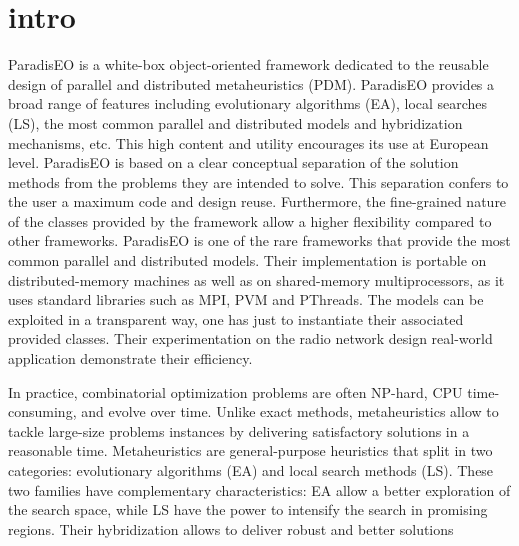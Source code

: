 \hypertarget{main_intro}{}\section{intro}\label{main_intro}
Paradis\-EO is a white-box object-oriented framework dedicated to the reusable design of parallel and distributed metaheuristics (PDM). Paradis\-EO provides a broad range of features including evolutionary algorithms (EA), local searches (LS), the most common parallel and distributed models and hybridization mechanisms, etc. This high content and utility encourages its use at European level. Paradis\-EO is based on a clear conceptual separation of the solution methods from the problems they are intended to solve. This separation confers to the user a maximum code and design reuse. Furthermore, the fine-grained nature of the classes provided by the framework allow a higher flexibility compared to other frameworks. Paradis\-EO is one of the rare frameworks that provide the most common parallel and distributed models. Their implementation is portable on distributed-memory machines as well as on shared-memory multiprocessors, as it uses standard libraries such as MPI, PVM and PThreads. The models can be exploited in a transparent way, one has just to instantiate their associated provided classes. Their experimentation on the radio network design real-world application demonstrate their efficiency.

In practice, combinatorial optimization problems are often NP-hard, CPU time-consuming, and evolve over time. Unlike exact methods, metaheuristics allow to tackle large-size problems instances by delivering satisfactory solutions in a reasonable time. Metaheuristics are general-purpose heuristics that split in two categories: evolutionary algorithms (EA) and local search methods (LS). These two families have complementary characteristics: EA allow a better exploration of the search space, while LS have the power to intensify the search in promising regions. Their hybridization allows to deliver robust and better solutions

